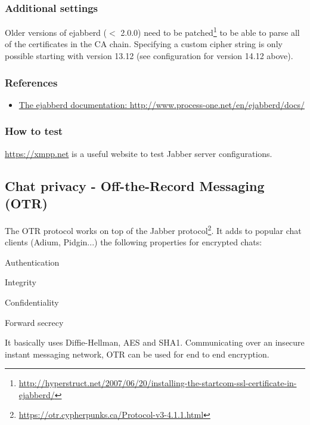 \subsubsection{Additional settings}
Older versions of ejabberd ($ < $ 2.0.0) need to be patched\footnote{\url{http://hyperstruct.net/2007/06/20/installing-the-startcom-ssl-certificate-in-ejabberd/}} to be able to parse all of the certificates in the CA chain.
Specifying a custom cipher string is only possible starting with version 13.12 (see configuration for version 14.12 above).

\subsubsection{References}

\begin{itemize}
\item \href{http://www.process-one.net/en/ejabberd/docs/}{The ejabberd documentation: http://www.process-one.net/en/ejabberd/docs/}
\end{itemize}


\subsubsection{How to test}
\begin{itemize*}
  \item \url{https://xmpp.net} is a useful website to test Jabber server configurations.
\end{itemize*}


\subsection{Chat privacy - Off-the-Record Messaging (OTR)}

The OTR protocol works on top of the Jabber protocol\footnote{\url{https://otr.cypherpunks.ca/Protocol-v3-4.1.1.html}}.  
It adds to popular chat clients (Adium, Pidgin...) the following properties for encrypted chats:
\begin{itemize*}
  \item Authentication
  \item Integrity
  \item Confidentiality
  \item Forward secrecy
\end{itemize*}

It basically uses Diffie-Hellman, AES and SHA1. Communicating over an insecure instant messaging network, OTR can be used for end to end encryption.

